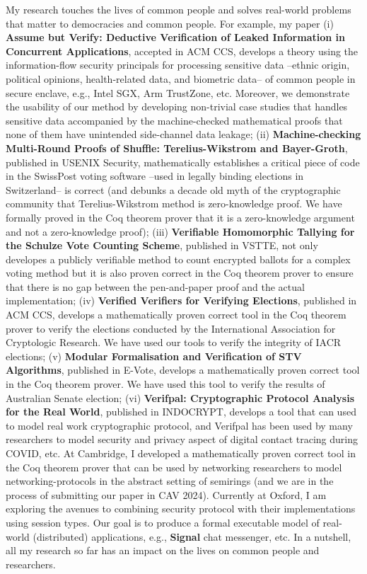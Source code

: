 \documentclass[11pt,a4paper,roman]{moderncv}
\begin{document}
My research touches the lives of common people and solves 
real-world problems that matter to democracies and common people. For example, my paper (i)
\textbf{Assume but Verify: Deductive Verification of Leaked Information in Concurrent Applications},
accepted in ACM CCS, develops a theory using the information-flow security principals 
for processing sensitive data --ethnic origin, political opinions,
health-related data, and  biometric data-- of common 
people in secure enclave, e.g., Intel SGX, Arm TrustZone, etc. Moreover, 
we demonstrate the usability of our method by developing non-trivial case studies that handles 
sensitive data accompanied by the machine-checked mathematical proofs that none of 
them have unintended side-channel data leakage; 
(ii) \textbf{Machine-checking Multi-Round Proofs of Shuffle: Terelius-Wikstrom and Bayer-Groth}, 
published in USENIX Security, mathematically establishes a critical piece of 
code in the SwissPost voting software --used in legally binding 
elections in Switzerland-- is correct (and debunks a decade old myth of the cryptographic 
community that Terelius-Wikstrom method is zero-knowledge proof. We have formally 
proved in the Coq theorem prover that it is a zero-knowledge argument and not 
a zero-knowledge proof);
(iii) \textbf{Verifiable Homomorphic Tallying for the Schulze Vote Counting Scheme}, published 
in VSTTE, not only developes a publicly verifiable method to count encrypted ballots for 
a complex voting method but it 
is also proven correct in the Coq theorem prover to ensure that there is no gap between 
the pen-and-paper proof and the actual implementation;  (iv) \textbf{Verified Verifiers for 
Verifying Elections}, published in ACM CCS, develops a mathematically proven correct tool 
in the Coq theorem prover to verify the elections conducted by 
the International Association for Cryptologic Research. We have used 
our tools to verify the integrity of IACR elections; (v) \textbf{Modular Formalisation and 
Verification of STV Algorithms}, published in E-Vote, develops a mathematically proven 
correct tool in the Coq theorem prover. We have used this tool to verify
the results of Australian Senate election; 
(vi) \textbf{Verifpal: Cryptographic Protocol Analysis for the Real World}, published in 
INDOCRYPT, develops a tool that can used to model real work cryptographic protocol, and 
Verifpal has been used by many researchers to model security and privacy aspect of 
digital contact tracing during COVID, etc.
At Cambridge, I developed a mathematically proven correct tool in the Coq theorem prover 
that can be used by networking researchers to model networking-protocols in the abstract 
setting of semirings (and we are in the process of submitting our paper in CAV 2024).
Currently at Oxford, I am exploring the avenues to combining security protocol with 
their implementations using session types. Our goal is to produce a formal executable 
model of real-world (distributed) applications, e.g., \textbf{Signal} chat messenger, etc.  
In a nutshell, all my research so far has an impact on the lives on common people and 
researchers. 
\end{document}
